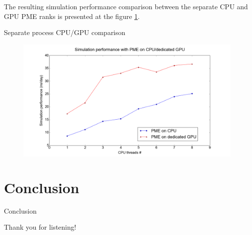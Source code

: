 \documentclass[11pt]{beamer}
\begin{document}
The resulting simulation performance comparison between the separate CPU and GPU PME ranks is presented at the figure \ref{fig:sepGPUNEW}.
\begin{frame}{Separate process CPU/GPU comparison}
\FloatBarrier
\begin{figure} [h!]
    \centering
    \includegraphics[width=1\textwidth]{pics/CPU_GPU_ADH.png}
    \label{fig:sepGPUNEW}
\end{figure}
\FloatBarrier
\end{frame}

\section{Conclusion}
\begin{frame}{Conclusion}
\end{frame}

\begin{frame}[plain]
      Thank you for listening!
\end{frame}

\end{document}
